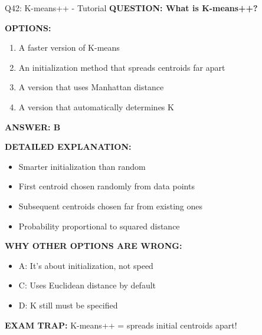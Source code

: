 \documentclass[8pt]{beamer}
\begin{document}
	\begin{frame}{Q42: K-means++ - Tutorial}
		\fontsize{6.5}{7.5}\selectfont
		\textbf{QUESTION: What is K-means++?}
		
		\vspace{0.1cm}
		\textbf{OPTIONS:}
		\begin{enumerate}
			\item A faster version of K-means
			\item An initialization method that spreads centroids far apart
			\item A version that uses Manhattan distance
			\item A version that automatically determines K
		\end{enumerate}
		
		\vspace{0.1cm}
		\textcolor{myblue}{\textbf{ANSWER: B}}
		
		\vspace{0.1cm}
		\textbf{DETAILED EXPLANATION:}
		\begin{itemize}
			\item Smarter initialization than random
			\item First centroid chosen randomly from data points
			\item Subsequent centroids chosen far from existing ones
			\item Probability proportional to squared distance
		\end{itemize}
		
		\vspace{0.1cm}
		\textcolor{myred}{\textbf{WHY OTHER OPTIONS ARE WRONG:}}
		\begin{itemize}
			\item \textcolor{myred}{A:} It's about initialization, not speed
			\item \textcolor{myred}{C:} Uses Euclidean distance by default
			\item \textcolor{myred}{D:} K still must be specified
		\end{itemize}
		
		\textcolor{myred}{\textbf{EXAM TRAP:}} K-means++ = \textcolor{myblue}{spreads initial centroids apart}!
	\end{frame}
	
\end{document}
